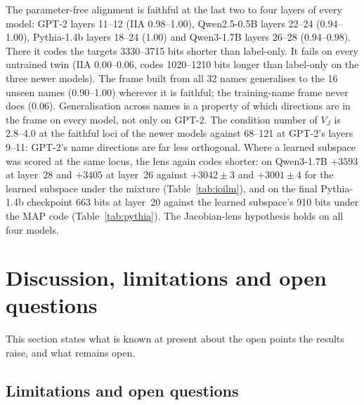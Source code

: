 \documentclass[11pt,a4paper]{article}
\begin{document}
The parameter-free alignment is faithful at the last two to four layers of every model: GPT-2 layers 11--12 (IIA 0.98--1.00), Qwen2.5-0.5B layers 22--24 (0.94--1.00), Pythia-1.4b layers 18--24 (1.00) and Qwen3-1.7B layers 26--28 (0.94--0.98). There it codes the targets 3330--3715 bits shorter than label-only. It fails on every untrained twin (IIA 0.00--0.06, codes 1020--1210 bits longer than label-only on the three newer models). The frame built from all 32 names generalises to the 16 unseen names (0.90--1.00) wherever it is faithful; the training-name frame never does (0.06). Generalisation across names is a property of which directions are in the frame on every model, not only on GPT-2. The condition number of $V_J$ is 2.8--4.0 at the faithful loci of the newer models against 68--121 at GPT-2's layers 9--11: GPT-2's name directions are far less orthogonal. Where a learned subspace was scored at the same locus, the lens again codes shorter: on Qwen3-1.7B $+3593$ at layer~28 and $+3405$ at layer~26 against $+3042\pm3$ and $+3001\pm4$ for the learned subspace under the mixture (Table~\ref{tab:ioilm}), and on the final Pythia-1.4b checkpoint 663 bits at layer~20 against the learned subspace's 910 bits under the MAP code (Table~\ref{tab:pythia}). The Jacobian-lens hypothesis holds on all four models.


\section{Discussion, limitations and open questions}
\label{sec:limits}

This section states what is known at present about the open points the results raise, and what remains open.

\subsection{Limitations and open questions}
\end{document}
